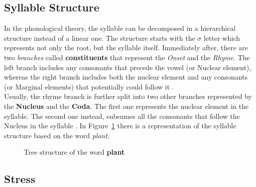 \subsection{Syllable Structure}
In the phonological theory, the syllable can be decomposed in a hierarchical structure instead of a linear one. The structure starts with the $\sigma$ letter which represents not only the root, but the syllable itself. Immediately after, there are two \textit{branches} called \textbf{constituents} that represent the \textit{Onset} and the \textit{Rhyme}. The left branch includes any consonants that precede the vowel (or Nuclear element), whereas the right branch includes both the nuclear element and any consonants (or Marginal elements) that potentially could follow it \cite{syllable_site}. \\
\noindent Usually, the rhyme branch is further split into two other branches represented by the \textbf{Nucleus} and the \textbf{Coda}. The first one represents the nuclear element in the syllable. The second one instead, subsumes all the consonants that follow the Nucleus in the syllable \cite{syllable_site}. In Figure~\ref{fig:syllable_structure} there is a representation of the syllable structure based on the word \textit{plant}.

\begin{figure}[!ht]
    \begin{center}
    \end{center}
    \caption{Tree structure of the word \textbf{plant}\protect\footnotemark}
    \label{fig:syllable_structure}
\end{figure}


\subsection{Stress}
\label{sec:stress}

